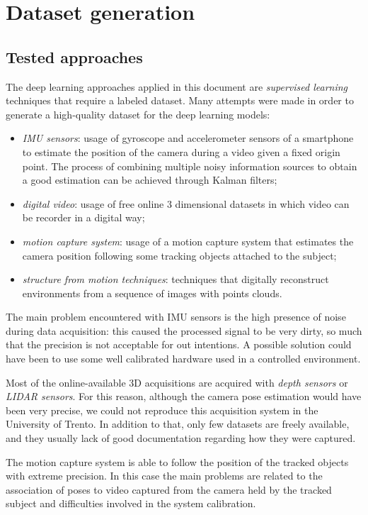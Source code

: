 \section{Dataset generation}
\subsection{Tested approaches}
The deep learning approaches applied in this document are \textit{supervised learning} techniques that require a labeled dataset. Many attempts were made in order to generate a high-quality dataset for the deep learning models:
\begin{itemize}
    \item \emph{IMU sensors}: usage of gyroscope and accelerometer sensors of a smartphone to estimate the position of the camera during a video given a fixed origin point. The process of combining multiple noisy information sources to obtain a good estimation can be achieved through Kalman filters;
    \item \emph{digital video}: usage of free online 3 dimensional datasets in which video can be recorder in a digital way;
    \item \emph{motion capture system}: usage of a motion capture system that estimates the camera position following some tracking objects attached to the subject;
    \item \emph{structure from motion techniques}: techniques that digitally reconstruct environments from a sequence of images with points clouds.
\end{itemize}

The main problem encountered with IMU sensors is the high presence of noise during data acquisition: this caused the processed signal to be very dirty, so much that the precision is not acceptable for out intentions. A possible solution could have been to use some well calibrated hardware used in a controlled environment.

Most of the online-available 3D acquisitions are acquired with \emph{depth sensors} or \emph{LIDAR sensors}. For this reason, although the camera pose estimation would have been very precise, we could not reproduce this acquisition system in the University of Trento. In addition to that, only few datasets are freely available, and they usually lack of good documentation regarding how they were captured.

The motion capture system is able to follow the position of the tracked objects with extreme precision. In this case the main problems are related to the association of poses to video captured from the camera held by the tracked subject and difficulties involved in the system calibration.

